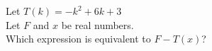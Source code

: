 \documentclass{ximera}
\begin{document}
\begin{exercise}
\begin{question}
\end{question}








\begin{question}
Let $T(k) = -k^2 + 6k + 3$ \\

Let $F$ and $x$ be real numbers. \\

Which expression is equivalent to $F-T(x)$?


\begin{multipleChoice}
\end{multipleChoice}

\end{question}







\end{exercise}
\end{document}
